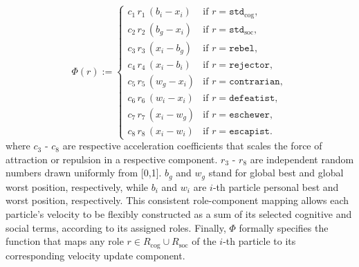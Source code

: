 {%
\begin{equation}
\Phi(r) := 
\begin{cases}
c_1\, r_1\, (b_i - x_i) 
    & \text{if } r = \texttt{std}_\text{cog}, \\
c_2\, r_2\, (b_g - x_i) 
    & \text{if } r = \texttt{std}_\text{soc}, \\
c_3\, r_3\, (x_i - b_g) 
    & \text{if } r = \texttt{rebel}, \\
c_4\, r_4\, (x_i - b_i) 
    & \text{if } r = \texttt{rejector}, \\
c_5\, r_5\, (w_g - x_i) 
    & \text{if } r = \texttt{contrarian}, \\
c_6\, r_6\, (w_i - x_i) 
    & \text{if } r = \texttt{defeatist}, \\
c_7\, r_7\, (x_i - w_g) 
    & \text{if } r = \texttt{eschewer}, \\
c_8\, r_8\, (x_i - w_i) 
    & \text{if } r = \texttt{escapist}.
\end{cases}
\end{equation}
where $c_3$ - $c_8$ are respective acceleration coefficients that scales the force of attraction or repulsion in a respective component. $r_3$ - $r_8$ are independent random numbers drawn uniformly from [0,1]. $b_{g}$ and $w_{g}$ stand for global best and global worst position, respectively, while $b_{i}$ and $w_{i}$ are $i$-th particle personal best and worst position, respectively. This consistent role-component mapping allows each particle’s velocity to be flexibly constructed as a sum of its selected cognitive and social terms, according to its assigned roles. Finally, \(\Phi\) formally specifies the function that maps any role \( r \in R_\text{cog} \cup R_\text{soc} \) of the \( i \)-th particle to its corresponding  velocity update component.






}
